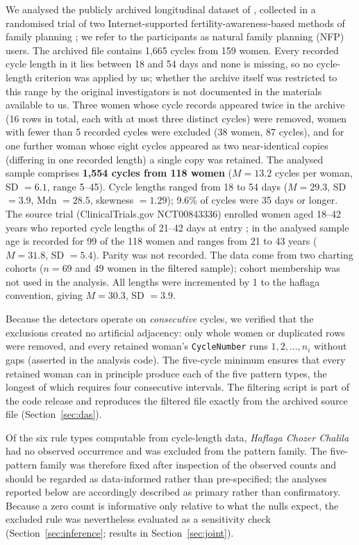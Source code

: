 \documentclass[12pt]{article}
\begin{document}
We analysed the publicly archived longitudinal dataset of \citet{fehring2012data},
collected in a randomised trial of two Internet-supported fertility-awareness-based
methods of family planning \citep{fehring2013}; we refer to the participants as natural
family planning (NFP) users. The archived file contains 1,665 cycles from 159 women.
Every recorded cycle length in it lies between 18 and 54 days and none is missing, so no
cycle-length criterion was applied by us; whether the archive itself was restricted to
this range by the original investigators is not documented in the materials available
to us. Three women whose cycle records appeared twice in the archive (16 rows in total,
each with at most three distinct cycles) were removed, women with fewer than 5 recorded
cycles were excluded (38 women, 87 cycles), and for one further woman whose eight cycles
appeared as two near-identical copies (differing in one recorded length) a single copy
was retained. The analysed sample comprises
\textbf{1,554 cycles from 118 women} ($M = 13.2$ cycles per woman, SD $= 6.1$, range
5--45). Cycle lengths ranged from 18 to 54 days ($M = 29.3$, SD $= 3.9$, Mdn $= 28.5$,
skewness $= 1.29$); 9.6\% of cycles were 35 days or longer. The source trial
(ClinicalTrials.gov NCT00843336) enrolled women aged 18--42 years who reported cycle
lengths of 21--42 days at entry \citep{fehring2013}; in the analysed sample age is recorded for
99 of the 118 women and ranges from 21 to 43 years ($M = 31.8$, SD $= 5.4$). Parity was
not recorded. The data come from two charting
cohorts ($n = 69$ and $49$ women in the filtered sample); cohort membership was not used
in the analysis. All lengths were incremented by 1 to the haflaga convention, giving
$M = 30.3$, SD $= 3.9$.

Because the detectors operate on \emph{consecutive} cycles, we verified that the
exclusions created no artificial adjacency: only whole women or duplicated rows were
removed, and every retained woman's \texttt{CycleNumber} runs $1, 2, \ldots, n_i$
without gaps (asserted in the analysis code). The five-cycle minimum ensures that every retained woman can in
principle produce each of the five pattern types, the longest of which requires four
consecutive intervals. The filtering script is part of the code release and reproduces
the filtered file exactly from the archived source file (Section~\ref{sec:das}).

Of the six rule types computable from cycle-length data, \textit{Haflaga Chozer
Chalila} had no observed occurrence and was excluded from the pattern family. The
five-pattern family was therefore fixed after inspection of the observed counts and
should be regarded as data-informed rather than pre-specified; the analyses reported
below are accordingly described as primary rather than confirmatory. Because a zero count
is informative only relative to what the nulls expect, the excluded rule was nevertheless
evaluated as a sensitivity check (Section~\ref{sec:inference}; results in
Section~\ref{sec:joint}).
\end{document}
